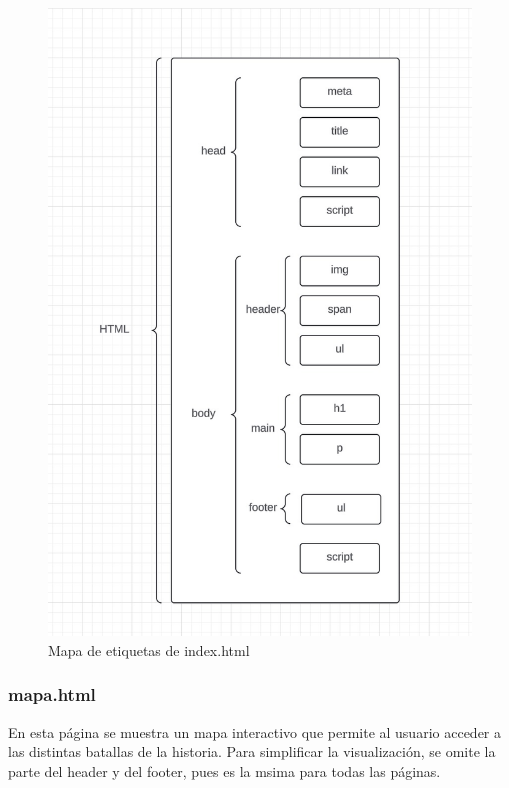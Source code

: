 \documentclass{article}
\begin{document}
\begin{figure}[H]
    \centering
    \includegraphics[width=\textwidth, height=1\textheight, keepaspectratio]{htmlFotos/MEindex.png}
    \caption{Mapa de etiquetas de index.html}
    \label{fig:mapa_etiquetas}
\end{figure}
\newpage

\subsubsection*{mapa.html}

En esta página se muestra un mapa interactivo que permite al usuario acceder a las distintas batallas de la historia. Para simplificar la visualización, se omite la parte del header y del footer, pues es la msima para todas las páginas.
\end{document}
